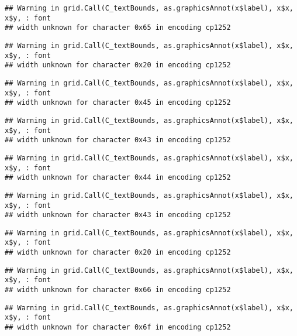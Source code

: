 \documentclass[
]{article}
\begin{document}
\begin{verbatim}
## Warning in grid.Call(C_textBounds, as.graphicsAnnot(x$label), x$x, x$y, : font
## width unknown for character 0x65 in encoding cp1252
\end{verbatim}

\begin{verbatim}
## Warning in grid.Call(C_textBounds, as.graphicsAnnot(x$label), x$x, x$y, : font
## width unknown for character 0x20 in encoding cp1252
\end{verbatim}

\begin{verbatim}
## Warning in grid.Call(C_textBounds, as.graphicsAnnot(x$label), x$x, x$y, : font
## width unknown for character 0x45 in encoding cp1252
\end{verbatim}

\begin{verbatim}
## Warning in grid.Call(C_textBounds, as.graphicsAnnot(x$label), x$x, x$y, : font
## width unknown for character 0x43 in encoding cp1252
\end{verbatim}

\begin{verbatim}
## Warning in grid.Call(C_textBounds, as.graphicsAnnot(x$label), x$x, x$y, : font
## width unknown for character 0x44 in encoding cp1252
\end{verbatim}

\begin{verbatim}
## Warning in grid.Call(C_textBounds, as.graphicsAnnot(x$label), x$x, x$y, : font
## width unknown for character 0x43 in encoding cp1252
\end{verbatim}

\begin{verbatim}
## Warning in grid.Call(C_textBounds, as.graphicsAnnot(x$label), x$x, x$y, : font
## width unknown for character 0x20 in encoding cp1252
\end{verbatim}

\begin{verbatim}
## Warning in grid.Call(C_textBounds, as.graphicsAnnot(x$label), x$x, x$y, : font
## width unknown for character 0x66 in encoding cp1252
\end{verbatim}

\begin{verbatim}
## Warning in grid.Call(C_textBounds, as.graphicsAnnot(x$label), x$x, x$y, : font
## width unknown for character 0x6f in encoding cp1252
\end{verbatim}
\end{document}
